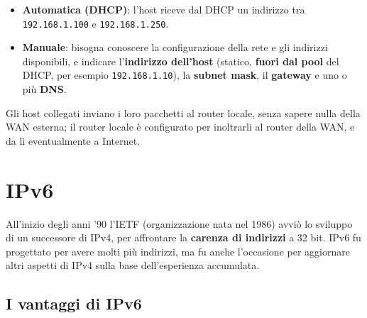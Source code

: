 \begin{itemize}
    \item \textbf{Automatica (DHCP)}: l'host riceve dal DHCP un indirizzo tra \texttt{192.168.1.100} e \texttt{192.168.1.250}.
    \item \textbf{Manuale}: bisogna conoscere la configurazione della rete e gli indirizzi disponibili, e indicare
          l'\textbf{indirizzo dell'host} (statico, \textbf{fuori dal pool} del DHCP, per esempio \texttt{192.168.1.10}), la
          \textbf{subnet mask}, il \textbf{gateway} e uno o più \textbf{DNS}.
\end{itemize}

Gli host collegati inviano i loro pacchetti al router locale, senza sapere nulla della WAN esterna; il router locale è
configurato per inoltrarli al router della WAN, e da lì eventualmente a Internet.


\section{IPv6}

All'inizio degli anni '90 l'IETF (organizzazione nata nel 1986) avviò lo sviluppo di un successore di IPv4, per
affrontare la \textbf{carenza di indirizzi} a 32 bit. IPv6 fu progettato per avere molti più indirizzi, ma fu anche
l'occasione per aggiornare altri aspetti di IPv4 sulla base dell'esperienza accumulata.


\subsection{I vantaggi di IPv6}

